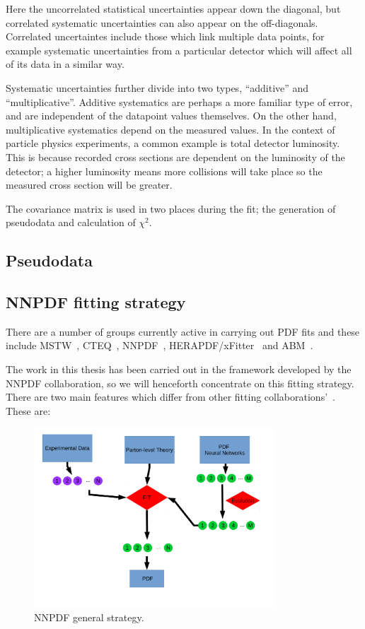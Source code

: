 Here the uncorrelated statistical uncertainties appear down the diagonal, but correlated
systematic uncertainties can also appear on the off-diagonals. Correlated uncertaintes include
those which link multiple data points, for example systematic uncertainties from a particular
detector which will affect all of its data in a similar way.

Systematic uncertainties further divide into two types, ``additive'' and ``multiplicative''.
Additive systematics are perhaps a more familiar type of error, and are independent of the
datapoint values themselves. On the other hand,  multiplicative systematics depend on the measured values. In the context of particle physics 
experiments, a common example is total detector luminosity. This is because recorded cross
sections are dependent on the luminosity of the detector; a higher luminosity means more
collisions will take place so the measured cross section will be greater.

The covariance matrix is used in two places during the fit; the generation of pseudodata and calculation
of $\chi^2$.

\subsection{Pseudodata}
\subsection{NNPDF fitting strategy}

There are a number of groups currently active in carrying out PDF fits and these include MSTW~\cite{Martin:2009bu}, CTEQ~\cite{Dulat:2015mca}, NNPDF~\cite{Ball:2017nwa}, HERAPDF/xFitter~\cite{CooperSarkar:2011aa} and ABM~\cite{Alekhin:2013nda}.

The work in this thesis has been carried out in the framework developed by the NNPDF collaboration, so we will henceforth concentrate on this fitting strategy. There are two main features which differ from other fitting collaborations'~\cite{Forte:2002fg}. These are:

\begin{figure}
\centering
\includegraphics[width=0.8\textwidth]{background/general_strategy_diagram.pdf}
\caption{NNPDF general strategy.}
\label{flowchart}
\end{figure}

